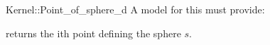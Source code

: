 \begin{ccRefFunctionObjectConcept}{Kernel::Point_of_sphere_d}
A model for this must provide:


{returns the ith point defining the sphere $s$.}

\end{ccRefFunctionObjectConcept}
